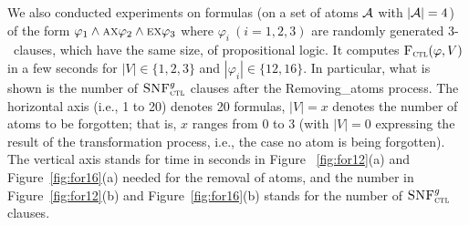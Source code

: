 \documentclass[twoside,11pt]{article}
\begin{document}
	
	We also conducted experiments on formulas (on a set of atoms ${\cal A}$ with $|{\cal A}| = 4$) of the form
	$\varphi_1\wedge \textsc{a} \textsc{x} \varphi_2  \wedge \textsc{e} \textsc{x} \varphi_3$ where
	$\varphi_i~(i=1,2,3)$ are randomly generated 3-\CNF\ clauses, which have the same size, of propositional logic.
	It computes ${\textsc{F}_{\textsc{ctl}}}(\varphi,V)$ in a few seconds for $|V|\in\{1,2,3\}$ and
	$|\varphi_i|\in\{12,16\}$.
	In particular,  what is shown is the number of ${\textsc{SNF}_{\textsc{ctl}}^g}$ clauses after the Removing\_atoms process. The horizontal axis (i.e., 1 to 20) denotes 20 formulas, $|V| = x$ denotes the number of atoms to be forgotten; that is, $x$ ranges from 0 to 3 (with $|V|=0$ expressing the result of the transformation process, i.e., the case no atom is being forgotten). The vertical axis  stands for time in seconds in Figure~
	\ref{fig:for12}(a) and Figure~\ref{fig:for16}(a) needed for the removal of atoms, and the number in Figure~\ref{fig:for12}(b) and Figure~\ref{fig:for16}(b) stands for the number of ${\textsc{SNF}_{\textsc{ctl}}^g}$ clauses.
	
	
\end{document}
